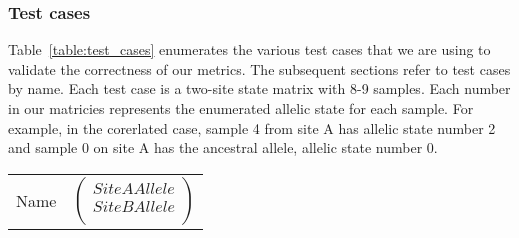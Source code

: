 \documentclass[12pt]{article}
\begin{document}
\subsubsection{Test cases}
Table~\ref{table:test_cases} enumerates the various test cases that we are using
to validate the correctness of our metrics. The subsequent sections refer to
test cases by name. Each test case is a two-site state matrix with 8-9
samples. Each number in our matricies represents the enumerated allelic state
for each sample. For example, in the corerlated case, sample 4 from site A has
allelic state number 2 and sample 0 on site A has the ancestral allele, allelic
state number 0.

\begin{table}[H]
  \centering
  \begin{tabular}{lc} Name & $\left(\begin{array}{cc} Site A Allele \\ Site B Allele
                                     \\ \end{array}\right)$ \\


\end{tabular}
\end{table}
\end{document}
